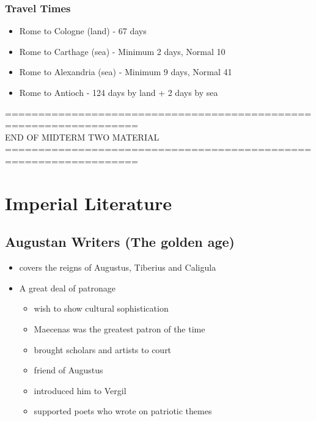 \documentclass[12pt, twoside]{article}
\begin{document}
\subsubsection{Travel Times}
\begin{itemize}
\item Rome to Cologne (land) - 67 days
\item Rome to Carthage (sea) - Minimum 2 days, Normal 10
\item Rome to Alexandria (sea) - Minimum 9 days, Normal 41
\item Rome to Antioch - 124 days by land + 2 days by sea
\end{itemize}

================================================================== \\
END OF MIDTERM TWO MATERIAL \\
================================================================== \\

\section{Imperial Literature}
\subsection{Augustan Writers (The golden age)}
\begin{itemize}
\item covers the reigns of Augustus, Tiberius and Caligula
\item A great deal of patronage
	\begin{itemize}
	\item wish to show cultural sophistication
	\item Maecenas was the greatest patron of the time
	\item brought scholars and artists to court
	\item friend of Augustus
	\item introduced him to Vergil
	\item supported poets who wrote on patriotic themes
	\end{itemize}
\end{itemize}
\end{document}
